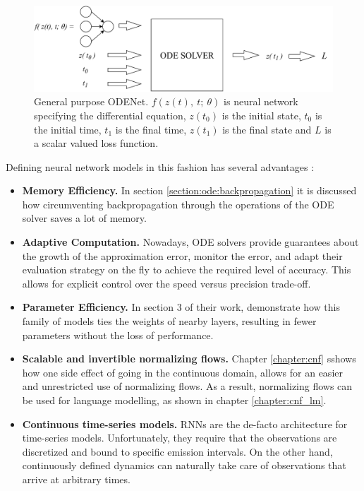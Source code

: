\begin{figure}[ht]
      \centering
      \includegraphics[width=\columnwidth]{figures/odenets_visualization.pdf}
      \caption{General purpose ODENet. $f(z(t), \ t; \ \theta) $ is neural network specifying the differential equation, $ z(t_0) $ is the initial state, $ t_0 $ is the initial time, $ t_1 $ is the final time, $ z(t_1) $ is the final state and $ L $ is a scalar valued loss function.}
      \label{figure:ode:odenets_visualization}
\end{figure}

Defining neural network models in this fashion has several advantages \cite{chen2018neural}:
\begin{itemize}
    \item \textbf{Memory Efficiency.} In section \ref{section:ode:backpropagation} it is discussed how circumventing backpropagation through the operations of the ODE solver saves a lot of memory.
    \item \textbf{Adaptive Computation.} Nowadays, ODE solvers provide guarantees about the growth of the approximation error, monitor the error, and adapt their evaluation strategy on the fly to achieve the required level of accuracy. This allows for explicit control over the speed versus precision trade-off.
    \item \textbf{Parameter Efficiency.} In section 3 of their work, \citet{chen2018neural} demonstrate how this family of models ties the weights of nearby layers, resulting in fewer parameters without the loss of performance.
    \item \textbf{Scalable and invertible normalizing flows.} Chapter \ref{chapter:cnf} sshows how one side effect of going in the continuous domain, allows for an easier and unrestricted use of normalizing flows. As a result, normalizing flows can be used for language modelling, as shown in chapter \ref{chapter:cnf_lm}.
    \item \textbf{Continuous time-series models.} RNNs are the de-facto architecture for time-series models. Unfortunately, they require that the observations are discretized and bound to specific emission intervals. On the other hand, continuously defined dynamics can naturally take care of observations that arrive at arbitrary times.
\end{itemize}

